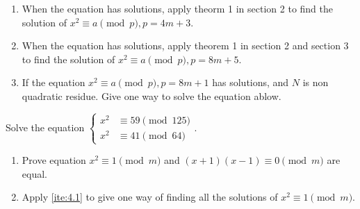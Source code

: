 \documentclass{ctexart}
\begin{document}
\begin{problem}\label{pro:2}
  \begin{enumerate}
    \item When the equation has solutions, apply theorm 1 in section 2 to
      find the solution of \(x^2 \equiv a \pmod{p}, p=4m + 3\).
    \item When the equation has solutions, apply theorem 1 in section 2 and section 3 to
      find the solution of \(x^2 \equiv a \pmod{p}, p=8m + 5\).
    \item If the equation \(x^2 \equiv a \pmod{p},p=8m + 1\) has solutions, and \(N \) is non quadratic residue.
      Give one way to solve the equation ablow.
  \end{enumerate}
\end{problem}
\begin{problem}\label{pro:3}
  Solve the equation \(\begin{cases}
    x^2 & \equiv 59 \pmod{125} \\
    x^2 & \equiv 41 \pmod{64}
  \end{cases}\).
\end{problem}
\begin{problem}\label{pro:4}
  \begin{enumerate}
    \item \label{ite:4.1} Prove equation \(x^2 \equiv 1 \pmod{m}\) and \((x + 1)(x-1) \equiv 0 \pmod{m}\) are equal.
    \item Apply \ref{ite:4.1} to give one way of finding all the solutions of \(x^2 \equiv 1 \pmod{m}\).
  \end{enumerate}
\end{problem}
\end{document}
